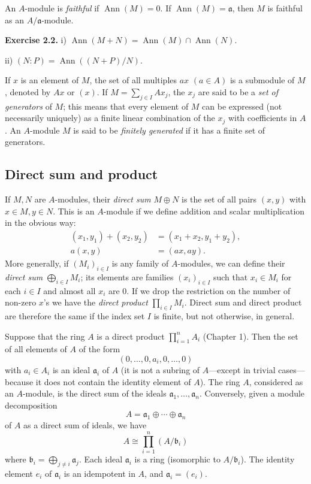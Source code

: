 An \(A\)-module is \emph{faithful} if \(\operatorname{Ann}(M)=0\). If \(\operatorname{Ann}(M)=\mathfrak a\), then \(M\) is faithful as an \(A/\mathfrak a\)-module.

\noindent\textbf{Exercise 2.2.} i) \(\operatorname{Ann}(M+N)=\operatorname{Ann}(M)\cap\operatorname{Ann}(N)\).

ii) \((N:P)=\operatorname{Ann}((N+P)/N)\).

If \(x\) is an element of \(M\), the set of all multiples \(ax\) \((a\in A)\) is a submodule of \(M\), denoted by \(Ax\) or \((x)\). If \(M=\sum_{j\in I}Ax_j\), the \(x_j\) are said to be a \emph{set of generators} of \(M\); this means that every element of \(M\) can be expressed (not necessarily uniquely) as a finite linear combination of the \(x_j\) with coefficients in \(A\). An \(A\)-module \(M\) is said to be \emph{finitely generated} if it has a finite set of generators.

\subsection{Direct sum and product}

If \(M,N\) are \(A\)-modules, their \emph{direct sum} \(M\oplus N\) is the set of all pairs \((x,y)\) with \(x\in M,y\in N\). This is an \(A\)-module if we define addition and scalar multiplication in the obvious way:
\[
\begin{aligned}
(x_1,y_1)+(x_2,y_2)&=(x_1+x_2,y_1+y_2),\\
a(x,y)&=(ax,ay).
\end{aligned}
\]
More generally, if \((M_i)_{i\in I}\) is any family of \(A\)-modules, we can define their \emph{direct sum} \(\bigoplus_{i\in I}M_i\); its elements are families \((x_i)_{i\in I}\) such that \(x_i\in M_i\) for each \(i\in I\) and almost all \(x_i\) are 0. If we drop the restriction on the number of non-zero \(x\)'s we have the \emph{direct product} \(\prod_{i\in I}M_i\). Direct sum and direct product are therefore the same if the index set \(I\) is finite, but not otherwise, in general.

Suppose that the ring \(A\) is a direct product \(\prod_{i=1}^nA_i\) (Chapter 1). Then the set of all elements of \(A\) of the form
\[
(0,\ldots,0,a_i,0,\ldots,0)
\]
with \(a_i\in A_i\) is an ideal \(\mathfrak a_i\) of \(A\) (it is not a subring of \(A\)---except in trivial cases---because it does not contain the identity element of \(A\)). The ring \(A\), considered as an \(A\)-module, is the direct sum of the ideals \(\mathfrak a_1,\ldots,\mathfrak a_n\). Conversely, given a module decomposition
\[
A=\mathfrak a_1\oplus\cdots\oplus\mathfrak a_n
\]
of \(A\) as a direct sum of ideals, we have
\[
A\cong\prod_{i=1}^n(A/\mathfrak b_i)
\]
where \(\mathfrak b_i=\bigoplus_{j\neq i}\mathfrak a_j\). Each ideal \(\mathfrak a_i\) is a ring (isomorphic to \(A/\mathfrak b_i\)). The identity element \(e_i\) of \(\mathfrak a_i\) is an idempotent in \(A\), and \(\mathfrak a_i=(e_i)\).

